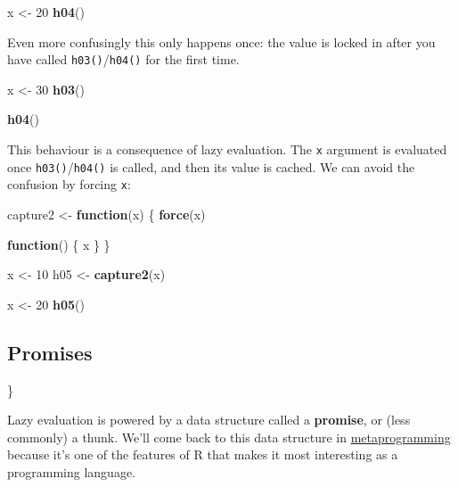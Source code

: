 \documentclass[]{book}
\newenvironment{Shaded}{\begin{snugshade}}{\end{snugshade}}
\newcommand{\KeywordTok}[1]{\textcolor[rgb]{0.13,0.29,0.53}{\textbf{#1}}}
\newcommand{\DecValTok}[1]{\textcolor[rgb]{0.00,0.00,0.81}{#1}}
\newcommand{\StringTok}[1]{\textcolor[rgb]{0.31,0.60,0.02}{#1}}
\newcommand{\ControlFlowTok}[1]{\textcolor[rgb]{0.13,0.29,0.53}{\textbf{#1}}}
\newcommand{\NormalTok}[1]{#1}
\theoremstyle{definition}
\theoremstyle{definition}
\theoremstyle{definition}
\theoremstyle{remark}
\begin{document}
\begin{Shaded}
\begin{Highlighting}[]
\NormalTok{x <-}\StringTok{ }\DecValTok{20}
\KeywordTok{h04}\NormalTok{()}
\end{Highlighting}
\end{Shaded}

Even more confusingly this only happens once: the value is locked in
after you have called \texttt{h03()}/\texttt{h04()} for the first time.

\begin{Shaded}
\begin{Highlighting}[]
\NormalTok{x <-}\StringTok{ }\DecValTok{30}
\KeywordTok{h03}\NormalTok{()}
\end{Highlighting}
\end{Shaded}

\begin{Shaded}
\begin{Highlighting}[]
\KeywordTok{h04}\NormalTok{()}
\end{Highlighting}
\end{Shaded}

This behaviour is a consequence of lazy evaluation. The \texttt{x}
argument is evaluated once \texttt{h03()}/\texttt{h04()} is called, and
then its value is cached. We can avoid the confusion by forcing
\texttt{x}:

\begin{Shaded}
\begin{Highlighting}[]
\NormalTok{capture2 <-}\StringTok{ }\ControlFlowTok{function}\NormalTok{(x) \{}
  \KeywordTok{force}\NormalTok{(x)}
  
  \ControlFlowTok{function}\NormalTok{() \{}
\NormalTok{    x}
\NormalTok{  \}}
\NormalTok{\}}

\NormalTok{x <-}\StringTok{ }\DecValTok{10}
\NormalTok{h05 <-}\StringTok{ }\KeywordTok{capture2}\NormalTok{(x)}

\NormalTok{x <-}\StringTok{ }\DecValTok{20}
\KeywordTok{h05}\NormalTok{()}
\end{Highlighting}
\end{Shaded}

\subsection{Promises}\label{promises}

\}

Lazy evaluation is powered by a data structure called a
\textbf{promise}, or (less commonly) a thunk. We'll come back to this
data structure in \protect\hyperlink{meta}{metaprogramming} because it's
one of the features of R that makes it most interesting as a programming
language.
\end{document}
